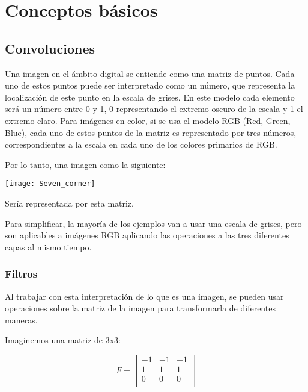 \chapter{Conceptos básicos}

\label{BasicConcepts}

\section{Convoluciones}

Una imagen en el ámbito digital se entiende como una matriz de puntos.
Cada uno de estos puntos puede ser interpretado como un número, que representa la localización de este punto en la escala de grises. En este modelo cada elemento será un número entre 0 y 1, 0 representando el extremo oscuro de la escala y 1 el extremo claro.
Para imágenes en color, si se usa el modelo RGB (Red, Green, Blue), cada uno de estos puntos de la matriz es representado por tres números, correspondientes a la escala en cada uno de los colores primarios de RGB.

Por lo tanto, una imagen como la siguiente:
\begin{center}
  \texttt{[image: Seven\_corner]}
\end{center}

Sería representada por esta matriz.

\begin{center}
\end{center}

Para simplificar, la mayoría de los ejemplos van a usar una escala de grises, pero son aplicables a imágenes RGB aplicando las operaciones a las tres diferentes capas al mismo tiempo.

\subsection{Filtros}

Al trabajar con esta interpretación de lo que es una imagen, se pueden usar operaciones sobre la matriz de la imagen para transformarla de diferentes maneras.

Imaginemos una matriz de 3x3:

\[
  F=
  \left[ {\begin{array}{ccc}
   -1 & -1 & -1 \\
   1 & 1 & 1 \\
   0 & 0 & 0 \\
  \end{array} } \right]
\]

